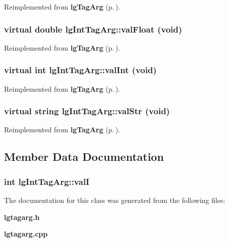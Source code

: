 Reimplemented from {\bf lg\-Tag\-Arg} {\rm (p.\,\pageref{classlgTagArg_a0})}.
\subsubsection{\setlength{\rightskip}{0pt plus 5cm}virtual double lg\-Int\-Tag\-Arg::val\-Float (void)\hspace{0.3cm}{\tt  [inline, virtual]}}\label{classlgIntTagArg_a3}




Reimplemented from {\bf lg\-Tag\-Arg} {\rm (p.\,\pageref{classlgTagArg_a5})}.
\subsubsection{\setlength{\rightskip}{0pt plus 5cm}virtual int lg\-Int\-Tag\-Arg::val\-Int (void)\hspace{0.3cm}{\tt  [inline, virtual]}}\label{classlgIntTagArg_a2}




Reimplemented from {\bf lg\-Tag\-Arg} {\rm (p.\,\pageref{classlgTagArg_a4})}.
\subsubsection{\setlength{\rightskip}{0pt plus 5cm}virtual string lg\-Int\-Tag\-Arg::val\-Str (void)\hspace{0.3cm}{\tt  [inline, virtual]}}\label{classlgIntTagArg_a4}




Reimplemented from {\bf lg\-Tag\-Arg} {\rm (p.\,\pageref{classlgTagArg_a3})}.

\subsection{Member Data Documentation}
\subsubsection{\setlength{\rightskip}{0pt plus 5cm}int {\bf lg\-Int\-Tag\-Arg::val\-I}\hspace{0.3cm}{\tt  [private]}}\label{classlgIntTagArg_r0}




The documentation for this class was generated from the following files:\begin{CompactItemize}
\item 
{\bf lgtagarg.h}\item 
{\bf lgtagarg.cpp}\end{CompactItemize}
